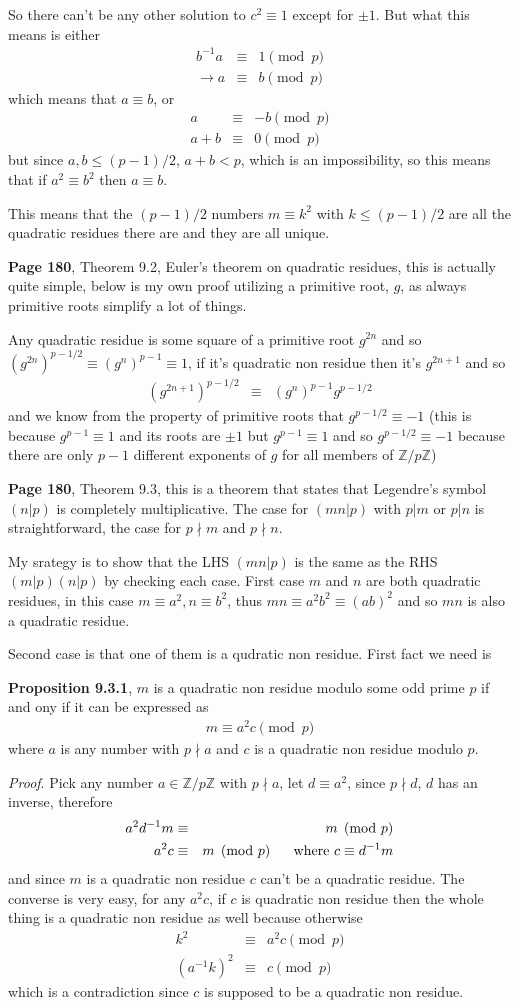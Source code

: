 \documentclass[aps,preprint,preprintnumbers,nofootinbib,showpacs,prd]{revtex4-1}
\newcommand{\nbea}{\begin{eqnarray*}}
\newcommand{\neea}{\end{eqnarray*}}
\begin{document}
So there can't be any other solution to $c^2 \equiv 1$ except for $\pm 1$. But what this means is either
%
\nbea
b^{-1} a & \equiv & 1 \pmod{p} \\
\to a & \equiv & b \pmod{p}
\neea
%
which means that $a \equiv b$, or
%
\nbea
a & \equiv & -b \pmod{p} \\
a + b & \equiv & 0 \pmod{p}
\neea
%
but since $a,b \le (p-1)/2$, $a+b < p$, which is an impossibility, so this means that if $a^2 \equiv b^2$ then $a \equiv b$.

This means that the $(p-1)/2$ numbers $m \equiv k^2$ with $k \le (p-1)/2$ are all the quadratic residues there are and they are all unique.

{\bf Page 180}, Theorem 9.2, Euler's theorem on quadratic residues, this is actually quite simple, below is my own proof utilizing a primitive root, $g$, as always primitive roots simplify a lot of things.

Any quadratic residue is some square of a primitive root $g^{2n}$ and so $(g^{2n})^{p-1/2} \equiv (g^n)^{p-1} \equiv 1$, if it's quadratic non residue then it's $g^{2n+1}$ and so 
%
\nbea
(g^{2n+1})^{p-1/2} & \equiv & (g^n)^{p-1} g^{p-1/2}
\neea
%
and we know from the property of primitive roots that $g^{p-1/2} \equiv -1$ (this is because $g^{p-1} \equiv 1$ and its roots are $\pm1$ but $g^{p-1} \equiv 1$ and so $g^{p-1/2} \equiv -1$ because there are only $p-1$ different exponents of $g$ for all members of $\mathbb{Z}/p\mathbb{Z}$)

{\bf Page 180}, Theorem 9.3, this is a theorem that states that Legendre's symbol $(n|p)$ is completely multiplicative. The case for $(mn|p)$ with $p|m$ or $p|n$ is straightforward, the case for $p\nmid m$ and $p\nmid n$.

My srategy is to show that the LHS $(mn|p)$ is the same as the RHS $(m|p)(n|p)$ by checking each case. First case $m$ and $n$ are both quadratic residues, in this case $m \equiv a^2, n \equiv b^2$, thus $mn \equiv a^2 b^2 \equiv (ab)^2$ and  so $mn$ is also a quadratic residue.

Second case is that one of them is a qudratic non residue. First fact we need is 

{\bf Proposition 9.3.1}, $m$ is a quadratic non residue modulo some odd prime $p$ if and ony if it can be expressed as 
%
\nbea
m \equiv a^2 c \pmod{p}
\neea
%
where $a$ is any number with $p\nmid a$ and $c$ is a quadratic non residue modulo $p$.

{\it Proof}. Pick any number $a \in \mathbb{Z}/p\mathbb{Z}$ with $p\nmid a$, let $d \equiv a^2$, since $p\nmid d$, $d$ has an inverse, therefore
%
\nbea
a^2 d^{-1} m & \equiv & m \pmod{p} \\
a^2 c & \equiv & m \pmod{p} ~~~~~ {\rm where~} c \equiv d^{-1} m
\neea
%
and since $m$ is a quadratic non residue $c$ can't be a quadratic residue. The converse is very easy, for any $a^2 c$, if $c$ is quadratic non residue then the whole thing is a quadratic non residue as well because otherwise
%
\nbea
k^2 & \equiv & a^2 c \pmod{p} \\
(a^{-1} k)^2 & \equiv & c \pmod{p}
\neea
%
which is a contradiction since $c$ is supposed to be a quadratic non residue.
\end{document}
